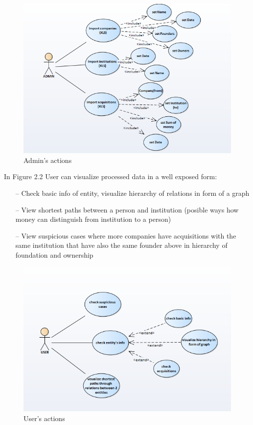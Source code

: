 \documentclass[12pt,a4paper,titlepage]{article}
\begin{document}
\begin{figure}[!ht] 
	\renewcommand\thefigure{2.1} %
	\centering 
	\includegraphics[width=17cm]{uc1.png} 
	\caption{ Admin's actions }\label{fig}
	\end{figure}



\newpage

In Figure 2.2 User can visualize processed data in a well exposed form:
\begin{itemize}
\item[--] Check basic info of entity, visualize hierarchy of relations in form of a graph
\item[--] View shortest paths between a person and institution (posible ways how money can distinguish from institution to a person)
\item[--] View suspicious cases where more companies have acquisitions with the same institution that have also the same founder above in hierarchy of foundation and ownership
\end{itemize}

\begin{figure}[!ht] 
	\renewcommand\thefigure{2.2} %
	\centering 
	\includegraphics[width=17cm]{uc2.png} 
	\caption{ User's actions }\label{fig}
	\end{figure}
\end{document}
